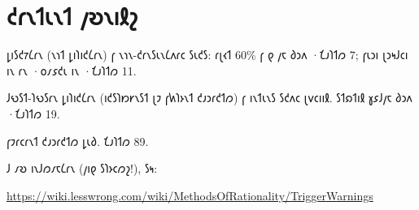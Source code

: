 \RequirePackage[pdf]{layout/shavian/hp-book}

{
\pagestyle{empty}



\chapter{𐑒𐑩𐑯𐑑𐑧𐑯𐑑 𐑢𐑹𐑯𐑦𐑙𐑟}
\thispagestyle{empty}

𐑛𐑦𐑕𐑒𐑳𐑖𐑩𐑯 (𐑯𐑪𐑑 𐑛𐑦𐑐𐑦𐑒𐑖𐑩𐑯) 𐑝 𐑯𐑪𐑯-𐑒𐑩𐑯𐑕𐑧𐑯𐑖𐑵𐑩𐑤 𐑕𐑧𐑒𐑕: 𐑩𐑚𐑬𐑑 60\% 𐑝 𐑞 𐑢𐑱 𐑔𐑮𐑵 ·𐑗𐑨𐑐𐑑𐑼 7; 𐑝𐑧𐑮𐑦 𐑚𐑮𐑰𐑓𐑤𐑦 𐑦𐑯 𐑩𐑯 ·𐑴𐑥𐑭𐑒𐑧 𐑦𐑯 ·𐑗𐑨𐑐𐑑𐑼 11.

𐑓𐑻𐑕𐑑-𐑐𐑻𐑕𐑩𐑯 𐑛𐑦𐑐𐑦𐑒𐑖𐑩𐑯 (𐑦𐑒𐑕𐑐𐑽𐑾𐑯𐑕𐑑 𐑚𐑲 𐑝𐑿𐑐𐑶𐑯𐑑 𐑒𐑨𐑮𐑩𐑒𐑑𐑼) 𐑝 𐑦𐑯𐑑𐑧𐑯𐑕 𐑕𐑒𐑵𐑤 𐑚𐑫𐑤𐑦𐑦𐑙. 𐑕𐑑𐑸𐑑𐑦𐑙 𐑣𐑭𐑓𐑢𐑱 𐑔𐑮𐑵 ·𐑗𐑨𐑐𐑑𐑼 19.

𐑝𐑲𐑩𐑤𐑩𐑯𐑑 𐑒𐑨𐑮𐑩𐑒𐑑𐑼 𐑛𐑧𐑔. 𐑗𐑨𐑐𐑑𐑼 89.

𐑓 𐑥𐑹 𐑦𐑯𐑓𐑼𐑥𐑱𐑖𐑩𐑯 (𐑢𐑦𐑞 𐑕𐑐𐑶𐑤𐑼𐑟!), 𐑕𐑰:
\begin{center}\url{https://wiki.lesswrong.com/wiki/MethodsOfRationality/TriggerWarnings}\end{center}

%
\cleartorecto
}
\setcounter{page}{1}
\renewcommand\chaptername{𐑗𐑨𐑐𐑑𐑼}








%
%
%
%
%
%
%
%
%
%
%
%
%

